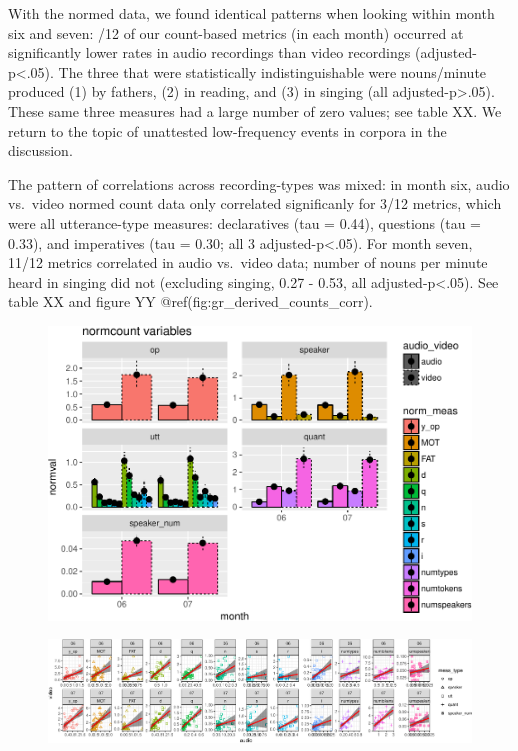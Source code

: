 \documentclass[man]{apa6}
\theoremstyle{definition}
\theoremstyle{definition}
\theoremstyle{definition}
\theoremstyle{remark}
\begin{document}
With the normed data, we found identical patterns when looking within
month six and seven: /12 of our count-based metrics (in each month)
occurred at significantly lower rates in audio recordings than video
recordings (adjusted-p\textless{}.05). The three that were statistically
indistinguishable were nouns/minute produced (1) by fathers, (2) in
reading, and (3) in singing (all adjusted-p\textgreater{}.05). These
same three measures had a large number of zero values; see table XX. We
return to the topic of unattested low-frequency events in corpora in the
discussion.

The pattern of correlations across recording-types was mixed: in month
six, audio vs.~video normed count data only correlated significanly for
3/12 metrics, which were all utterance-type measures: declaratives (tau
= 0.44), questions (tau = 0.33), and imperatives (tau = 0.30; all 3
adjusted-p\textless{}.05). For month seven, 11/12 metrics correlated in
audio vs.~video data; number of nouns per minute heard in singing did
not (excluding singing, 0.27 - 0.53, all adjusted-p\textless{}.05). See
table XX and figure YY @ref(fig:gr\_derived\_counts\_corr).

\begin{figure}[htbp]
\centering
\includegraphics{sixseven_papaja_files/figure-latex/gr_derived_counts_diff-1.pdf}
\caption{}
\end{figure}

\begin{figure}[htbp]
\centering
\includegraphics{sixseven_papaja_files/figure-latex/gr_derived_counts_corr-1.pdf}
\caption{}
\end{figure}
\end{document}
